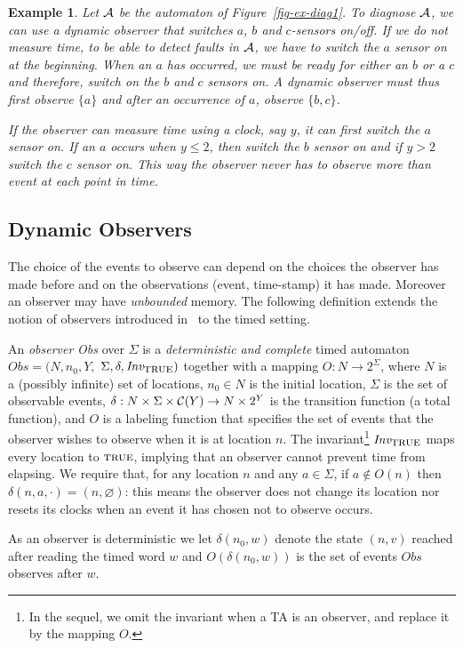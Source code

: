 \documentclass[letterpaper,10pt,conference]{ieeeconf}  \IEEEoverridecommandlockouts                              \overrideIEEEmargins
\newtheorem{example}{Example}
\def\calA{{\cal A}}
\def\calC{{\cal C}}
\def\endef{\ifmmode\squareforged\else{\unskip\nobreak\hfil
\penalty50\hskip1em\null\nobreak\hfil$\blacksquare$
\parfillskip=0pt\finalhyphendemerits=0\endgraf}\fi}
\def\endex{\ifmmode\squareforged\else{\unskip\nobreak\hfil
\penalty50\hskip1em\null\nobreak\hfil$\square$
\parfillskip=0pt\finalhyphendemerits=0\endgraf}\fi}
\def\true{\mbox{\textsc{true}}}
\def\obs{\textit{Obs}\xspace}
\begin{document}
\begin{example}
  Let $\calA$ be the automaton of Figure~\ref{fig-ex-diag1}.  To
  diagnose $\calA$, we can use a \emph{dynamic observer} that
  switches $a$, $b$ and $c$-sensors on/off.  If we do not measure time,
  to be able to detect faults in $\calA$, we have to switch the $a$
  sensor on at the beginning. When an $a$ has occurred, we must be
  ready for either an $b$ or a $c$ and therefore, switch on the $b$
  and $c$ sensors on. A dynamic observer must thus first observe
  $\{a\}$ and after an occurrence of $a$, observe $\{b,c\}$.

  If the observer can measure time using a clock, say $y$, it can
  first switch the $a$ sensor on. If an $a$ occurs when $y \leq 2$,
  then switch the $b$ sensor on and if $y >2$ switch the $c$ sensor
  on. This way the observer never has to observe more than event at
  each point in time. \endex
\end{example}


\subsection{Dynamic Observers}
The choice of the events to observe can depend on the choices the
observer has made before and on the observations (event, time-stamp) it
has made. Moreover an observer may have \emph{unbounded} memory.  The
following definition extends the notion of observers introduced
in~\cite{cassez-acsd-07} to the timed setting.
 
\begin{definition}[Observer]\label{def-observer2}
  An \emph{observer} \obs over $\Sigma$ is a \emph{deterministic and
    complete} timed automaton $\obs=(N,n_0,Y,$
  $\Sigma,\delta,\inv_{\true})$ together with a mapping $O: N
  \rightarrow 2^\Sigma$, where $N$ is a (possibly infinite) set of
  locations, $n_0\in N$ is the initial location, $\Sigma$ is the set
  of observable events, $\delta : N \times \Sigma \times \calC(Y)
  \rightarrow N \times 2^Y$ is the transition function (a total
  function), and $O$ is a labeling function that specifies the set of
  events that the observer wishes to observe when it is at location
  $n$. The invariant\footnote{In the sequel, we omit the invariant
    when a TA is an observer, and replace it by the mapping $O$.}
  $\inv_{\true}$ maps every location to $\true$, implying that an
  observer cannot prevent time from elapsing. We require that, for any
  location $n$ and any $a\in\Sigma$, if $a\not\in O(n)$ then
  $\delta(n,a,\cdot)=(n,\varnothing)$: this means the observer does
  not change its location nor resets its clocks when an event it has
  chosen not to observe occurs.  \endef
\end{definition}
As an observer is deterministic we let $\delta(n_0,w)$ 
denote the state $(n,v)$ reached after reading the timed word $w$ and
$O(\delta(n_0,w))$ is the set of events $\obs$ observes after $w$.
\end{document}
